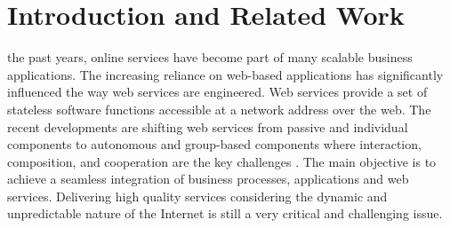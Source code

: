 \documentclass[10pt,journal,cspaper,compsoc]{IEEEtran}
\begin{document}
\maketitle


\IEEEdisplaynotcompsoctitleabstractindextext


%
\IEEEpeerreviewmaketitle



\section{Introduction and Related Work}

 the past years, online services have become
part of many scalable business applications. The increasing
reliance on web-based applications has significantly influenced
the way web services are engineered. Web services provide a set of
stateless software functions accessible at a network address over
the web. The recent developments are shifting web services from
passive and individual components to autonomous and group-based
components where interaction, composition, and cooperation are the
key challenges \cite{ICWS2011-1,SCC2011-1,Baldoni2010,Younas2013}.
The main objective is to achieve a seamless integration of
business processes, applications and web services. Delivering high
quality services considering the dynamic and unpredictable nature
of the Internet is still a very critical and challenging issue.
\end{document}
